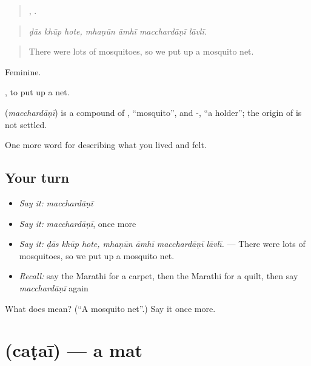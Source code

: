 \begin{quote}
  ,    .
\end{quote}

\begin{quote}
\emph{ḍās khūp hote, mhaṇūn āmhī macchardāṇī lāvlī.}
\end{quote}

\begin{quote}
There were lots of mosquitoes, so we put up a mosquito net.
\end{quote}

Feminine.

 , to put up a net.

\begin{cousinweb}
\textbf{} (\emph{macchardāṇī}) is a compound of , \textquotedblleft{}mosquito\textquotedblright{}, and -, \textquotedblleft{}a holder\textquotedblright{}; the origin of  is not settled.
\end{cousinweb}

\begin{grammarlens}[title={What you've built}]
One more word for describing what you lived and felt.
\end{grammarlens}

\subsection*{Your turn}
\begin{itemize}
\raggedright
  \item \emph{Say it:} \emph{macchardāṇī}
  \item \emph{Say it:} \emph{macchardāṇī}, once more
  \item \emph{Say it:} \emph{ḍās khūp hote, mhaṇūn āmhī macchardāṇī lāvlī.} — There were lots of mosquitoes, so we put up a mosquito net.
  \item \emph{Recall:} say the Marathi for a carpet, then the Marathi for a quilt, then say \emph{macchardāṇī} again
\end{itemize}

\begin{tcolorbox}[breakable,colback=teal!4,colframe=teal!35!black,title={Before you move on}]
What does  mean? (\textquotedblleft{}A mosquito net\textquotedblright{}.) Say it once more.
\end{tcolorbox}
\section[\texorpdfstring{\mr{चटई} (caṭaī)}{चटई (caṭaī)}]{ (caṭaī) — a mat}

